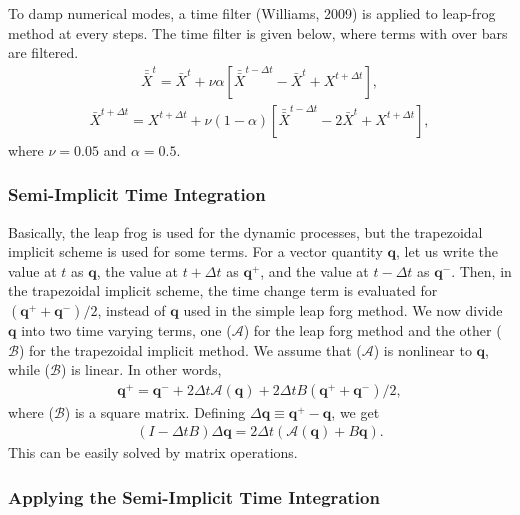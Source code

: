 To damp numerical modes, a time filter (Williams, 2009) is applied to leap-frog method at every steps. The time filter is given below, where terms with over bars are filtered. \begin{eqnarray}
\bar{\bar{X}}^{t} = \bar{X}^{t} + \nu \alpha [\bar{\bar{X}}^{t-\Delta t} - \bar{X}^{t} + X^{t+\Delta t}],   \end{eqnarray} \begin{eqnarray}
\bar{X}^{t+\Delta t} = X^{t+\Delta t} + \nu (1-\alpha) [\bar{\bar{X}}^{t-\Delta t} - 2 \bar{X}^{t} + X^{t+\Delta t}],   \end{eqnarray} where \(\nu=0.05\) and \(\alpha=0.5\).

\hypertarget{semi-implicit-time-integration}{%
\subsubsection{Semi-Implicit Time Integration}\label{semi-implicit-time-integration}}

Basically, the leap frog is used for the dynamic processes, but the trapezoidal implicit scheme is used for some terms. For a vector quantity \({\mathbf q}\), let us write the value at \(t\) as
\({\mathbf q}\), the value at \(t+\Delta t\) as \({\mathbf q}^+\), and the value at \(t-\Delta t\) as \({\mathbf q}^-\). Then, in the trapezoidal implicit scheme, the time change term is evaluated for
\(({\mathbf q}^+ + {\mathbf q}^- )/2\), instead of \({\mathbf q}\) used in the simple leap forg method. We now divide \({\mathbf q}\) into two time varying terms, one (\({\mathcal A}\)) for the leap
forg method and the other (\({\mathcal B}\)) for the trapezoidal implicit method. We assume that (\({\mathcal A}\)) is nonlinear to \({\mathbf q}\), while (\({\mathcal B}\)) is linear. In other words,
\begin{eqnarray}
  {\mathbf q}^+
      = {\mathbf q}^-
      + 2 \Delta t {\mathcal A}( {\mathbf q}  )
      + 2 \Delta t B (   {\mathbf q}^+
                       + {\mathbf q}^-   )/2,   \end{eqnarray} where (\({\mathcal B}\)) is a square matrix. Defining \(\Delta {\mathbf q} \equiv {\mathbf q}^+ - {\mathbf q}\), we get \begin{eqnarray}
  ( I - \Delta t B ) \Delta {\mathbf q}
      = 2 \Delta t \left( {\mathcal A}({\mathbf q})
                         + B {\mathbf q} \right).   \end{eqnarray} This can be easily solved by matrix operations.

\hypertarget{applying-the-semi-implicit-time-integration}{%
\subsubsection{Applying the Semi-Implicit Time Integration}\label{applying-the-semi-implicit-time-integration}}

